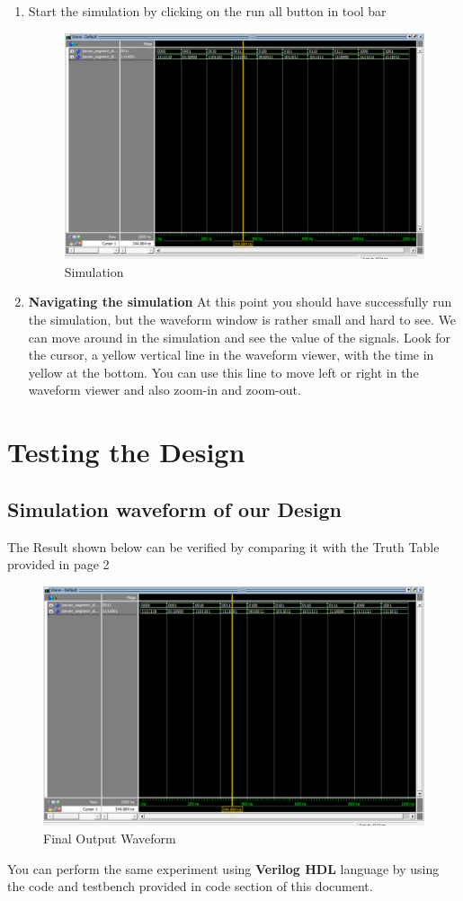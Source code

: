 \documentclass[12pt,singleside,a4paper]{article}
\begin{document}
\begin{enumerate}
        \item Start the simulation by clicking on the run all button in tool bar
        \begin{figure}[H]
        \centering
    \includegraphics[width=11cm,keepaspectratio]{Simulation/Simulation4.png}
    \caption{Simulation}
    \end{figure}
    \item \textbf{Navigating the simulation }
    At this point you should have successfully run the simulation, but the waveform window is rather small and hard to see. 
    We can  move around in the simulation and see the value of the signals. Look for the cursor, a yellow vertical line in the waveform viewer, with the time in yellow at the bottom. You can use this line to move left or right in the waveform viewer and also zoom-in and zoom-out. 
    \end{enumerate}

\section{Testing the Design}

\subsection{Simulation waveform of our Design}
The Result shown below can be verified by comparing it with the Truth Table \\provided in page 2
    \begin{figure}[H]
    \centering
    \includegraphics[width = 14cm,keepaspectratio]{Simulation/Simulation4.png}
    \caption{Final Output Waveform}
    \end{figure}
    
\noindent You can perform the same experiment using \textbf{Verilog HDL} language by using the code and testbench provided in code section of this document.
\end{document}
